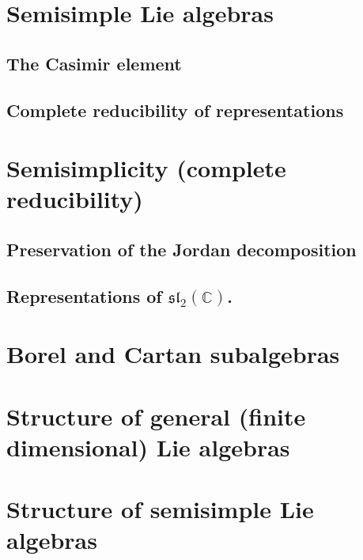 \section{Semisimple Lie algebras}
\label{section-semisimple}

\subsection{The Casimir element} 
\label{subsection-Casimir}


\subsection{Complete reducibility of representations}
\label{subsection-complete-reducibility}

\section{Semisimplicity (complete reducibility)}




\subsection{Preservation of the Jordan decomposition}
\label{subsection-preservation-Jordan}

\subsection{Representations of $\mathfrak{sl}_2(\mathbb C)$.}
\label{subsection-representations-sl2}


\section{Borel and Cartan subalgebras}
\label{section-Borel-Cartan}





\section{Structure of general (finite dimensional) Lie algebras}



\section{Structure of semisimple Lie algebras}



